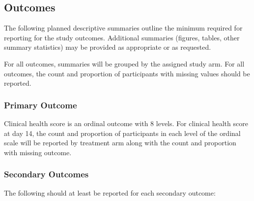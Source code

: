 \documentclass[11pt,parskip=half-]{scrartcl}
\begin{document}
\subsection{Outcomes}

The following planned descriptive summaries outline the minimum required for reporting for the study outcomes. Additional summaries (figures, tables, other summary statistics) may be provided as appropriate or as requested.

For all outcomes, summaries will be grouped by the assigned study arm. For all outcomes, the count and proportion of participants with missing values should be reported.

\subsubsection{Primary Outcome}
Clinical health score is an ordinal outcome with 8 levels. For clinical health score at day 14, the count and proportion of participants in each level of the ordinal scale will be reported by treatment arm along with the count and proportion with missing outcome.

\subsubsection{Secondary Outcomes}

The following should at least be reported for each secondary outcome:
\end{document}

